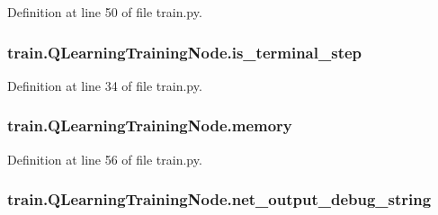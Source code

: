 Definition at line 50 of file train.\+py.

\subsubsection[{\texorpdfstring{is\+\_\+terminal\+\_\+step}{is_terminal_step}}]{\setlength{\rightskip}{0pt plus 5cm}train.\+Q\+Learning\+Training\+Node.\+is\+\_\+terminal\+\_\+step}\hypertarget{classtrain_1_1_q_learning_training_node_a0f8d5e71ae52a959d5248f57ac55829a}{}\label{classtrain_1_1_q_learning_training_node_a0f8d5e71ae52a959d5248f57ac55829a}


Definition at line 34 of file train.\+py.

\subsubsection[{\texorpdfstring{memory}{memory}}]{\setlength{\rightskip}{0pt plus 5cm}train.\+Q\+Learning\+Training\+Node.\+memory}\hypertarget{classtrain_1_1_q_learning_training_node_a49440485cce2f2f3fe9575456a562098}{}\label{classtrain_1_1_q_learning_training_node_a49440485cce2f2f3fe9575456a562098}


Definition at line 56 of file train.\+py.

\subsubsection[{\texorpdfstring{net\+\_\+output\+\_\+debug\+\_\+string}{net_output_debug_string}}]{\setlength{\rightskip}{0pt plus 5cm}train.\+Q\+Learning\+Training\+Node.\+net\+\_\+output\+\_\+debug\+\_\+string}\hypertarget{classtrain_1_1_q_learning_training_node_a5837c478232e1d4cc646bfbadbdd2ff2}{}\label{classtrain_1_1_q_learning_training_node_a5837c478232e1d4cc646bfbadbdd2ff2}


